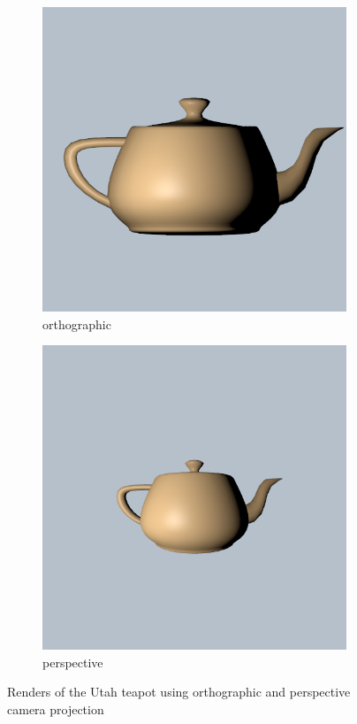 \documentclass{article}
\begin{document}
\begin{figure}[h]
	\centering
	\begin{subfigure}{0.45\textwidth}
		\includegraphics[width=\textwidth]{teapot_orthographic}
		\caption{orthographic}
		\label{fig:utah_orthographic}
	\end{subfigure}%
	\hfill
	\begin{subfigure}{0.45\textwidth}
		\includegraphics[width=\textwidth]{teapot_perspective}
		\caption{perspective}
		\label{fig:utah_perspective}
	\end{subfigure}
	
	\caption{Renders of the Utah teapot using orthographic and perspective camera projection}
	\label{fig:camera_projections}
\end{figure}
\end{document}
